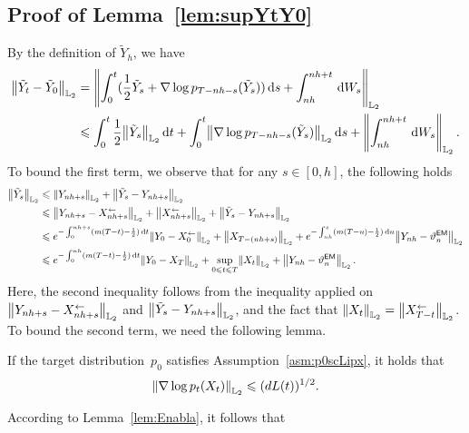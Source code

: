 \subsection{Proof of Lemma~\ref{lem:supYtY0}}
By the definition of $\tilde{Y}_h$, we have
\begin{align*}
    \l|\tilde{Y}_t-\tilde{Y}_0\r|_{\Ltwo}
    &=\left\lVert\int_0^t(\dfrac{1}{2}\tilde{Y}_s+\nabla\log p_{T-nh-s}(\tilde{Y}_s))\rmd s+\int_{nh}^{nh+t}\rmd W_s\right\rVert_{\Ltwo}\\
   & \leqslant \int_0^t\dfrac{1}{2}\l|\tilde{Y}_s\r|_{\Ltwo}\rmd t+\int_0^t\l|\nabla\log p_{T-nh-s}(\tilde{Y}_s)\r|_{\Ltwo}\rmd s+\left\lVert\int_{nh}^{nh+t}\rmd W_s\right\rVert_{\Ltwo}\,.
\end{align*}
To bound the first term, we observe that for any $s\in[0,h]$, the following holds
\begin{align*}
\l|\tilde{Y}_s\r|_{\Ltwo}
&\leqslant \l|Y_{nh+s}\r|_{\Ltwo}+\l|\tilde{Y}_s-Y_{nh+s}\r|_{\Ltwo}\\
    &\leqslant \l|Y_{nh+s}-X_{nh+s}^{\leftarrow}\r|_{\Ltwo}+\l|X_{nh+s}^{\leftarrow}\r|_{\Ltwo}+\l|\tilde{Y}_s-Y_{nh+s}\r|_{\Ltwo}\\
    &\leqslant e^{-\int_0^{nh+s}(m(T-t)-\frac{1}{2})\rmd t}\l|Y_0-X_0^{\leftarrow}\r|_{\Ltwo}+\l|X_{T-(nh+s)}\r|_{\Ltwo}+e^{-\int_{nh}^s(m(T-u)-\frac{1}{2})\rmd u}\l|Y_{nh}-\vartheta_n^{\sf EM}\r|_{\Ltwo}\\
    &\leqslant  e^{-\int_0^{nh}(m(T-t)-\frac{1}{2})\rmd t}\l|Y_0-X_T\r|_{\Ltwo}+\sup_{0\leqslant t\leqslant T}\l|X_t\r|_{\Ltwo}+\l|Y_{nh}-\vartheta_n^{\sf EM}\r|_{\Ltwo}\,.
\end{align*}
Here, the second inequality follows from the  inequality applied on $\l|Y_{nh+s}-X_{nh+s}^{\leftarrow}\r|_{\Ltwo}$ and $\l|\tilde{Y}_s-Y_{nh+s}\r|_{\Ltwo}$, and the fact that $\l|X_t\r|_{\Ltwo}=\l|X_{T-t}^{\leftarrow}\r|_{\Ltwo}$.
To bound the second term, we need the following lemma.
\begin{lemma}
    \label{lem:Enabla}
    If the target distribution~$p_0$ satisfies Assumption~\ref{asm:p0scLipx}, it holds that
    \begin{align*}
        \l|\nabla\log p_{t}(X_t)\r|_{\Ltwo}\leqslant (dL(t))^{1/2}.
    \end{align*}
\end{lemma}
According to Lemma~\ref{lem:Enabla}, it follows that
